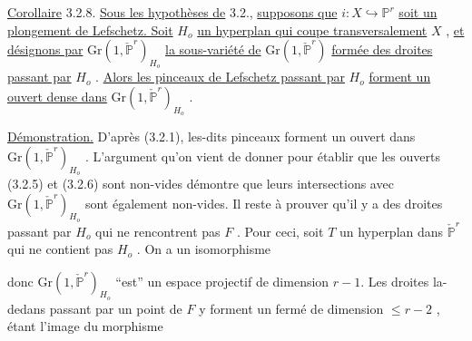 \underline{Corollaire} 3.2.8. \underline{Sous les hypothèses de} 3.2., \underline{supposons que} $i : X \hookrightarrow \mathbb{P}^{r}$ \underline{soit un plongement de Lefschetz. Soit} $H_{o}$ \underline{un hyperplan qui coupe transversalement} $X$ , \underline{et désignons par} $\mathrm{Gr}(1, \check{\mathbb{P}}^{r})_{H_{o}}$ \underline{la sous-variété de} $\mathrm{Gr}(1, \check{\mathbb{P}}^{r})$ \underline{formée des droites passant par} $H_{o}$ . \underline{Alors les pinceaux de Lefschetz passant par} $H_{o}$ \underline{forment un ouvert dense dans} $\mathrm{Gr}(1, \check{\mathbb{P}}^{r})_{H_{o}}$ .

\underline{Démonstration.} D'après (3.2.1), les-dits pinceaux forment un ouvert dans $\mathrm{Gr}(1, \check{\mathbb{P}}^{r})_{H_{o}}$ . L'argument qu'on vient de donner pour
établir que les ouverts (3.2.5) et (3.2.6) sont non-vides démontre que leurs intersections avec $\mathrm{Gr}(1, \check{\mathbb{P}}^{r})_{H_{o}}$ sont également non-vides. Il reste à prouver qu'il y a des droites passant par $H_{o}$ qui ne rencontrent pas $F$ . Pour ceci, soit $T$ un hyperplan dans $\check{\mathbb{P}}^{r}$ qui ne contient pas $H_{o}$ . On a un isomorphisme

\begin{center}
\end{center}
donc $\mathrm{Gr}(1, \check{\mathbb{P}}^{r})_{H_{o}}$ ``est'' un espace projectif de dimension $r-1$. Les droites la-dedans passant par un point de $F$ y forment un fermé de dimension $\leq r-2$ , étant l'image du morphisme

